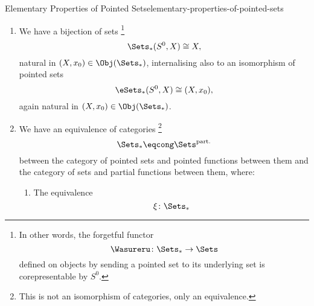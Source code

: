 \begin{proposition}{Elementary Properties of Pointed Sets}{elementary-properties-of-pointed-sets}
\begin{enumerate}
            \footnote{%
                The category $\Sets_{*}$ does admit a natural monoidal closed structure, however; see \ChapterTensorProductsOfPointedSets.
            }%
        \item\label{elementary-properties-of-pointed-sets-morphisms-from-the-monoidal-unit}We have a bijection of sets%
            \footnote{%
                In other words, the forgetful functor
                \[%
                    \Wasureru%
                    \colon%
                    \Sets_{*}%
                    \to%
                    \Sets%
                \]%
                defined on objects by sending a pointed set to its underlying set is corepresentable by $S^{0}$.
                \par\vspace*{\TCBBoxCorrection}
            }%
            \[
                \Sets_{*}(S^{0},X)
                \cong
                X,
            \]%
            natural in $(X,x_{0})\in\Obj(\Sets_{*})$, internalising also to an isomorphism of pointed sets
            \[
                \eSets_{*}(S^{0},X)
                \cong
                (X,x_{0}),
            \]%
            again natural in $(X,x_{0})\in\Obj(\Sets_{*})$.
        \item\label{elementary-properties-of-pointed-sets-relation-to-partial-functions}We have an equivalence of categories%
            \footnote{%
                \textdbend{}This is not an isomorphism of categories, only an equivalence.
                \par\vspace*{\TCBBoxCorrection}
            }%
            \[
                \Sets_{*}%
                \eqcong%
                \Sets^{\mathrm{part.}}
            \]%
            between the category of pointed sets and pointed functions between them and the category of sets and partial functions between them, where:
            \begin{enumerate}
                \item{}The equivalence
                    \[
                        \xi%
                        \colon%
                        \Sets_{*}%
\]
\end{enumerate}
\end{enumerate}
\end{proposition}
